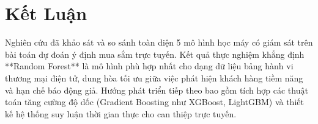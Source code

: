 \documentclass[11pt,a4paper]{article}
\begin{document}
\section{Kết Luận}
Nghiên cứu đã khảo sát và so sánh toàn diện 5 mô hình học máy có giám sát trên bài toán dự đoán ý định mua sắm trực tuyến. Kết quả thực nghiệm khẳng định **Random Forest** là mô hình phù hợp nhất cho dạng dữ liệu bảng hành vi thương mại điện tử, dung hòa tối ưu giữa việc phát hiện khách hàng tiềm năng và hạn chế báo động giả. Hướng phát triển tiếp theo bao gồm tích hợp các thuật toán tăng cường độ dốc (Gradient Boosting như XGBoost, LightGBM) và thiết kế hệ thống suy luận thời gian thực cho can thiệp trực tuyến.



\end{document}
